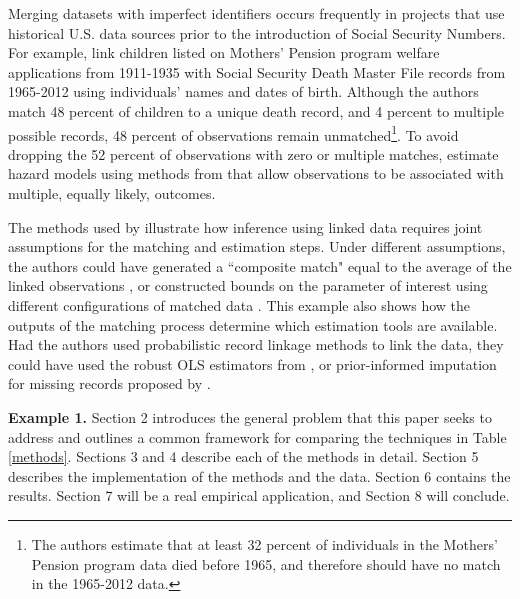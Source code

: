 \documentclass[12pt]{article}
\begin{document}
Merging datasets with imperfect identifiers occurs frequently in projects that use historical U.S. data sources prior to the introduction of Social Security Numbers.  For example, \cite{aizer2016} link children listed on Mothers' Pension program welfare applications from 1911-1935 with Social Security Death Master File records from 1965-2012 using individuals' names and dates of birth.  Although the authors match 48 percent of children to a unique death record, and 4 percent to multiple possible records, 48 percent of observations remain unmatched\footnote{The authors estimate that at least 32 percent of individuals in the Mothers' Pension program data died before 1965, and therefore should have no match in the 1965-2012 data.}.  To avoid dropping the 52 percent of observations with zero or multiple matches, \cite{aizer2016} estimate hazard models using methods from \cite{ahl2019} that allow observations to be associated with multiple, equally likely, outcomes.  

The methods used by \cite{aizer2016} illustrate how inference using linked data requires joint assumptions for the matching and estimation steps.  Under different assumptions, the authors could have generated a ``composite match" equal to the average of the linked observations \citep{bleakley2016}, or constructed bounds on the parameter of interest using different configurations of matched data \citep{nq2015}.   This example also shows how the outputs of the matching process determine which estimation tools are available.  Had the authors used probabilistic record linkage methods to link the data, they could have used the robust OLS estimators from \cite{lahiri05}, or prior-informed imputation for missing records proposed by \cite{Goldstein2012}.   


\textbf{Example 1.}   Section 2 introduces the general problem that this paper seeks to address and outlines a common framework for comparing the techniques in Table \ref{methods}.  Sections 3 and 4 describe each of the methods in detail. Section 5 describes the implementation of the methods and the data.  Section 6 contains the results.  Section 7 will be a real empirical application, and Section 8 will conclude.
\end{document}

